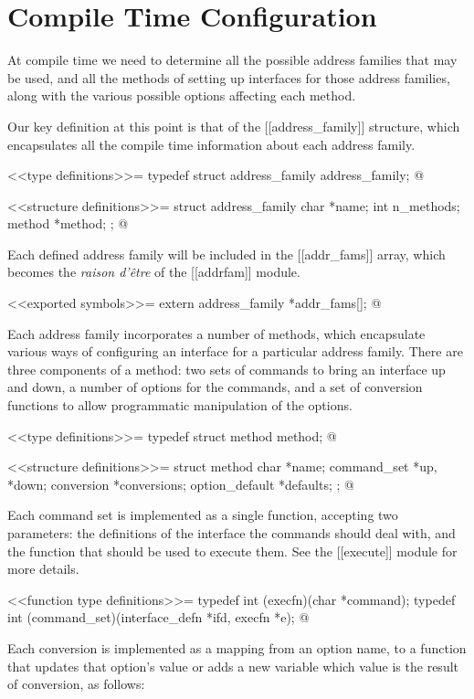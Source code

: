 \documentclass{article}
\begin{document}
{\section{Compile Time Configuration}

At compile time we need to determine all the possible address families
that may be used, and all the methods of setting up interfaces for
those address families, along with the various possible options
affecting each method.

Our key definition at this point is that of the [[address_family]]
structure, which encapsulates all the compile time information about
each address family.

<<type definitions>>=
typedef struct address_family address_family;
@ 

<<structure definitions>>=
struct address_family {
	char *name;
	int n_methods;
	method *method;
};
@ 

Each defined address family will be included in the [[addr_fams]]
array, which becomes the \emph{raison d'\^etre} of the [[addrfam]]
module.

<<exported symbols>>=
extern address_family *addr_fams[];
@ 

Each address family incorporates a number of methods, which
encapsulate various ways of configuring an interface for a particular
address family. There are three components of a method: two sets of
commands to bring an interface up and down, a number of options for
the commands, and a set of conversion functions to allow programmatic
manipulation of the options.

<<type definitions>>=
typedef struct method method;
@ 

<<structure definitions>>=
struct method {
	char *name;
	command_set *up, *down;
	conversion *conversions;
	option_default *defaults;
};
@ 

Each command set is implemented as a single function, accepting two
parameters: the definitions of the interface the commands should deal
with, and the function that should be used to execute them. See the
[[execute]] module for more details.

<<function type definitions>>=
typedef int (execfn)(char *command);
typedef int (command_set)(interface_defn *ifd, execfn *e);
@ 

Each conversion is implemented as a mapping from an option name, to a
function that updates that option's value or adds a new variable which
value is the result of conversion, as follows:

}
\end{document}
